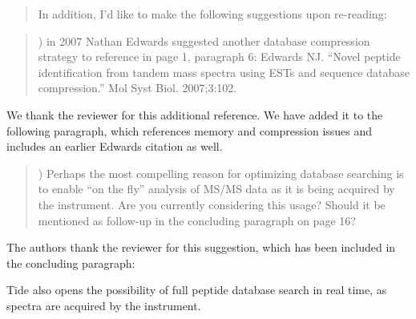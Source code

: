 \documentclass{article}
\newcommand{\breview}{\begin{quotation}\begin{em}\noindent}
\newcommand{\ereview}{\end{em}\end{quotation}}
\begin{document}
\breview In addition, I'd like to make the following suggestions upon
re-reading:
\ereview

\breview 1) in 2007 Nathan Edwards suggested another database
compression strategy to reference in page 1, paragraph 6: Edwards
NJ. ``Novel peptide identification from tandem mass spectra using ESTs
and sequence database compression.'' Mol Syst Biol. 2007;3:102.
\ereview

We thank the reviewer for this additional reference. We have added it
to the following paragraph, which references memory and compression
issues and includes an earlier Edwards citation as well.

\breview 2) Perhaps the most compelling reason for optimizing database
searching is to enable ``on the fly'' analysis of MS/MS data as it is
being acquired by the instrument.  Are you currently considering this
usage?  Should it be mentioned as follow-up in the concluding
paragraph on page 16?
\ereview

The authors thank the reviewer for this suggestion, which has been
included in the concluding paragraph:

Tide also opens the possibility of full peptide database search in
real time, as spectra are acquired by the instrument.
\end{document}
